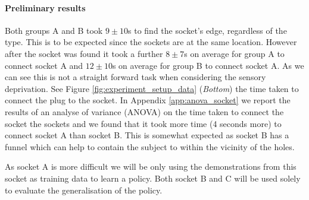 

\paragraph{Preliminary results}

Both groups A and B took $9\pm10$s to find the socket's edge, regardless of the type. This is to be expected since the sockets 
are at the same location. However after the socket was found it took a further $8\pm7$s on average for group A to connect
socket A and $12\pm10$s on average for group B to connect socket A. As we can see this is not a straight forward task when considering
the sensory deprivation. See Figure \ref{fig:experiment_setup_data} (\textit{Bottom}) the time taken to connect the plug to the socket.
In Appendix \ref{app:anova_socket} we report the results of an analyse of variance (ANOVA) on the time taken to connect the socket 
the sockets and we found that it took more time (4 seconds more) to connect socket A than socket B. This is somewhat expected as 
socket B has a funnel which can help to contain the subject to within the vicinity of the holes.

As socket A is more difficult we will be only using the demonstrations from this socket as training data to learn a policy. Both
socket B and C will be used solely to evaluate the generalisation of the policy.

